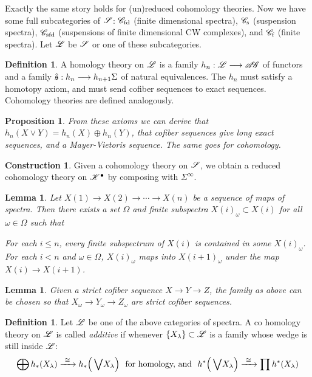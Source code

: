 \documentclass[11pt]{article}
\theoremstyle{plain}
\newtheorem{lem}[thm]{Lemma}
\newtheorem{prop}[thm]{Proposition}
\theoremstyle{definition}
\newtheorem{const}[thm]{Construction}
\newtheorem{defn}[thm]{Definition}
\newcommand{\AG}{\scrA\!\scrG}
\newcommand{\Specf}{\scrC_\textup{f}}
\newcommand{\Specfd}{\scrC_\textup{fd}}
\newcommand{\Specs}{\scrC_\textup{s}}
\newcommand{\Specsfd}{\scrC_\textup{sfd}}
\begin{document}
{\noindent Exactly the same story holds for (un)reduced cohomology theories. Now
we have some full subcategories of $\mathscr{S}$: $\Specfd$ (finite dimensional
spectra), $\Specs$ (suspension spectra), $\Specsfd$ (suspensions of finite
dimensional CW complexes), and $\Specf$ (finite spectra). Let $\mathscr{L}$ be $\mathscr{S}$
or one of these subcategories.
\setcounter{thm}{9}
\begin{defn}
A homology theory on $\mathscr{L}$ is a family $h_n:\scrL\to\AG$ of functors and a
family $\hat{\mathfrak{s}}:h_n\longrightarrow h_{n+1}\Sigma$ of natural equivalences. The $h_n$ must
satisfy a homotopy axiom, and must send cofiber sequences to exact sequences.
Cohomology theories are defined analogously.
\end{defn}
\begin{prop}
From these axioms we can derive that $h_n(X\vee Y)=h_n(X)\oplus h_n(Y)$, that
cofiber sequences give long exact sequences, and a Mayer-Vietoris sequence. The
same goes for cohomology.
\end{prop}
\setcounter{thm}{12}
\begin{const}
Given a \lparen co\rparen homology theory on $\mathscr{S}$, we obtain a reduced
\lparen co\rparen homology theory on $\mathscr{K}^\bullet$ by composing with
$\Sigma^\infty$.
\end{const}
\begin{lem}
Let $X(1)\to X(2)\to \cdots\to X(n)$ be a sequence of maps of spectra. Then
there exists a set $\Omega$ and finite subspectra $X(i)_\omega\subset X(i)$ for
all $\omega\in\Omega$ such that\upcol
\begin{itemise}
\itm For each $i\leq n$, every finite subspectrum of $X(i)$ is contained in some
$X(i)_\omega$.
\itm For each $i<n$ and $\omega\in\Omega$, $X(i)_\omega$ maps into
$X(i+1)_\omega$ under the map $X(i)\to X(i+1)$.
\end{itemise}
\end{lem}
\begin{lem}
Given a strict cofiber sequence $X\to Y\to Z$, the family as above can be chosen
so that $X_\omega\to Y_\omega\to Z_\omega$ are strict cofiber sequences.
\end{lem}
\begin{defn}
Let $\mathscr{L}$ be one of the above categories of spectra. A \lparen co\rparen
homology theory on $\mathscr{L}$ is called \emph{additive} if whenever
$\{X_\lambda\}\subset\mathscr{L}$ is a family whose wedge is still inside $\mathscr{L}$:
\[\bigoplus h_*(X_\lambda)\xrightarrow{\ \cong\
}h_*\Bigl(\,\bigvee\!X_\lambda\Bigr) \text{ \ for homology, and \
}h^*\Bigl(\,\bigvee\!X_\lambda\Bigr) \xrightarrow{\ \cong\ }\prod h^*(X_\lambda)
\]
\end{defn}}
\end{document}
